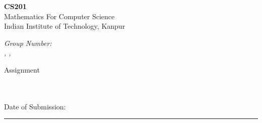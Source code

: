 \newcommand{\courseNumb}{CS201}
\newcommand{\courseName}{Mathematics For Computer Science}
\newcommand{\subDate}{}
\newcommand{\assignNumb}{1}

\begin{minipage}[t]{0.50\linewidth}
    \begin{flushleft}
        {\huge \textbf{\courseNumb}}\\
        {\large \courseName}\\
        {\normalsize Indian Institute of Technology, Kanpur}\\
        \rule{0mm}{8mm}%
        {\large \itshape Group Number: \GroupNum}\\
        {\normalsize \textit{\MembAName, \MembBName, \MembCName}}
    \end{flushleft}

\end{minipage}
\hfill
\begin{minipage}[t]{0.40\linewidth}
    \centering
    {\huge Assignment}\\ \rule{0mm}{15mm} \scalebox{5}{\assignNumb}\\~\\
        Date of Submission: \subDate

\end{minipage}

\rule{0mm}{0.5mm}%

{\centering \rule{0.99\linewidth}{1pt} }